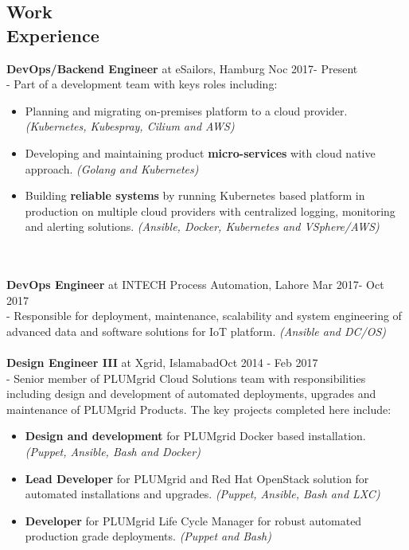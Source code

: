 \documentclass[margin]{res}
\begin{document}
\begin{resume}
\section{Work \\ Experience}
\textbf{DevOps/Backend Engineer} at eSailors, Hamburg \hfill     Noc 2017- Present \\
- Part of a development team with keys roles including:
    \begin{itemize}
      \item Planning and migrating on-premises platform to a cloud provider. \textit{(Kubernetes, Kubespray, Cilium and AWS)}
      \item Developing and maintaining product \textbf{micro-services} with cloud native approach. \textit{(Golang and Kubernetes)}
      \item Building \textbf{reliable systems} by running Kubernetes based platform in production on multiple cloud providers with centralized logging, monitoring and alerting solutions. \textit{(Ansible, Docker, Kubernetes and VSphere/AWS)}
    \end{itemize}    \\ \\
\textbf{DevOps Engineer} at INTECH Process Automation, Lahore \hfill     Mar 2017- Oct 2017 \\
- Responsible for deployment, maintenance, scalability and system engineering of advanced data and software solutions for IoT platform. \textit{(Ansible and DC/OS)}   \\ \\
{\bf Design Engineer III} at Xgrid, Islamabad\hfill     Oct 2014 - Feb 2017 \\
- Senior member of PLUMgrid Cloud Solutions team with responsibilities including design and development of automated deployments, upgrades and maintenance of PLUMgrid Products. The key projects completed here include:
    \begin{itemize}  \itemsep -2pt %
        \item \textbf{Design and development} for PLUMgrid Docker based installation. \textit{(Puppet, Ansible, Bash and Docker)}
        \item \textbf{Lead Developer} for PLUMgrid and Red Hat OpenStack solution for automated installations and upgrades. \textit{(Puppet, Ansible, Bash and LXC)}
        \item \textbf{Developer} for PLUMgrid Life Cycle Manager for robust automated production grade deployments. \textit{(Puppet and Bash)}
    \end{itemize}


\end{resume}
\end{document}
